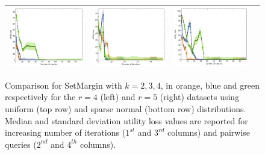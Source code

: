 \documentclass{article}
\renewcommand\[{\begin{equation}}
\renewcommand\]{\end{equation}}
\begin{document}
\begin{figure}[h!]
{\begin{tabular}{cccc}
        \includegraphics[width=10em]{figures/synthetic_vs_self_4_normal_sparse_per_query_loss} &
        \includegraphics[width=10em]{figures/synthetic_vs_self_5_normal_sparse_per_iter_loss} &
        \includegraphics[width=10em]{figures/synthetic_vs_self_5_normal_sparse_per_query_loss}
        \\
        \hline
     \end{tabular}
    }
    \caption{\label{fig:selfcomparison} Comparison for {\sc SetMargin}
      with $k=2,3,4$, in orange, blue and green respectively for the
      $r=4$ (left) and $r=5$ (right) datasets using uniform (top row) and sparse normal (bottom row) distributions. Median and standard deviation utility loss values are reported for increasing number of iterations ($1^{st}$ and $3^{rd}$ columns) and pairwise queries ($2^{nd}$ and $4^{th}$ columns).}
\end{figure}
\end{document}
